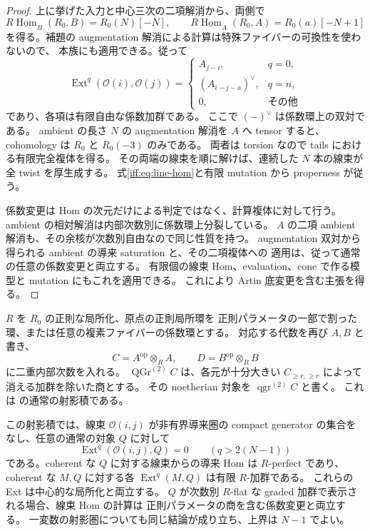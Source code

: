 \begin{proof}
上に挙げた入力と中心三次の二項解消から、両側で
\[
 R\underline{\operatorname{Hom}}_B(R_0,B)=R_0(N)[-N],
 \qquad
 R\underline{\operatorname{Hom}}_A(R_0,A)=R_0(a)[-N+1]
\]
を得る。補題の
augmentation 解消による計算は特殊ファイバーの可換性を使わないので、
本族にも適用できる。従って
\begin{equation}\label{iff:eq:line-hom}
 \operatorname{Ext}^q(\mathcal O(i),\mathcal O(j))=
 \begin{cases}
  A_{j-i},&q=0,\\
  (A_{i-j-a})^\vee,&q=n,\\
  0,&\text{その他}
 \end{cases}
\end{equation}
であり、各項は有限自由な係数加群である。
ここで $(-)^\vee$ は係数環上の双対である。
ambient の長さ $N$ の augmentation 解消を $A$ へ tensor すると、
cohomology は $R_0$ と $R_0(-3)$ のみである。
両者は torsion なので tails における有限完全複体を得る。
その両端の線束を順に解けば、連続した $N$ 本の線束が全 twist を厚生成する。
式\eqref{iff:eq:line-hom}と有限 mutation から properness が従う。

係数変更は Hom の次元だけによる判定ではなく、計算複体に対して行う。
ambient の相対解消は内部次数別に係数環上分裂している。
$A$ の二項 ambient 解消も、その余核が次数別自由なので同じ性質を持つ。
augmentation 双対から得られる ambient の導来 saturation と、その二項複体への
適用は、従って通常の任意の係数変更と両立する。
有限個の線束 Hom、evaluation、cone で作る模型と mutation にもこれを適用できる。
これにより Artin 底変更を含む主張を得る。
\end{proof}

$R$ を $R_0$ の正則な局所化、原点の正則局所環を
正則パラメータの一部で割った環、または任意の複素ファイバーの係数環とする。
対応する代数を再び $A,B$ と書き、
\[
 C=A^{\mathrm{op}}\otimes_R A,\qquad
 D=B^{\mathrm{op}}\otimes_R B
\]
に二重内部次数を入れる。
$\operatorname{QGr}^{(2)}C$ は、各元が十分大きい
$C_{\geq r,\geq r}$ によって消える加群を除いた商とする。
その noetherian 対象を $\operatorname{qgr}^{(2)}C$ と書く。
これは \cite[Definitions~3.16, 3.18]{CMOBallardFarman} の通常の射影積である。

\begin{lemma}[正則な係数環上の射影積の有限性]
\label{iff:lem:projective-product}
この射影積では、線束 $\mathcal O(i,j)$ が非有界導来圏の
compact generator の集合をなし、任意の通常の対象 $Q$ に対して
\[
 \operatorname{Ext}^q(\mathcal O(i,j),Q)=0
       \qquad(q>2(N-1))
\]
である。coherent な $Q$ に対する線束からの導来 Hom は $R$-perfect であり、
coherent な $M,Q$ に対する各 $\operatorname{Ext}^q(M,Q)$ は有限 $R$-加群である。
これらの Ext は中心的な局所化と両立する。
$Q$ が次数別 $R$-flat な graded 加群で表示される場合、線束 Hom の計算は
正則パラメータの商を含む係数変更と両立する。
一変数の射影圏についても同じ結論が成り立ち、上界は $N-1$ でよい。
\end{lemma}

